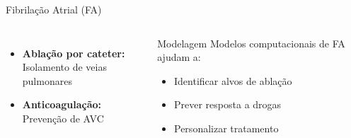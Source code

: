 \begin{frame}{Fibrilação Atrial (FA)}
\begin{columns}
\begin{itemize}
    \item \textbf{Ablação por cateter:}\\
    Isolamento de veias pulmonares

    \item \textbf{Anticoagulação:}\\
    Prevenção de AVC
\end{itemize}

\vspace{0.3cm}

\begin{exampleblock}{Modelagem}
Modelos computacionais de FA ajudam a:
\begin{itemize}
    \item Identificar alvos de ablação
    \item Prever resposta a drogas
    \item Personalizar tratamento
\end{itemize}
\end{exampleblock}
\end{columns}
\end{frame}

